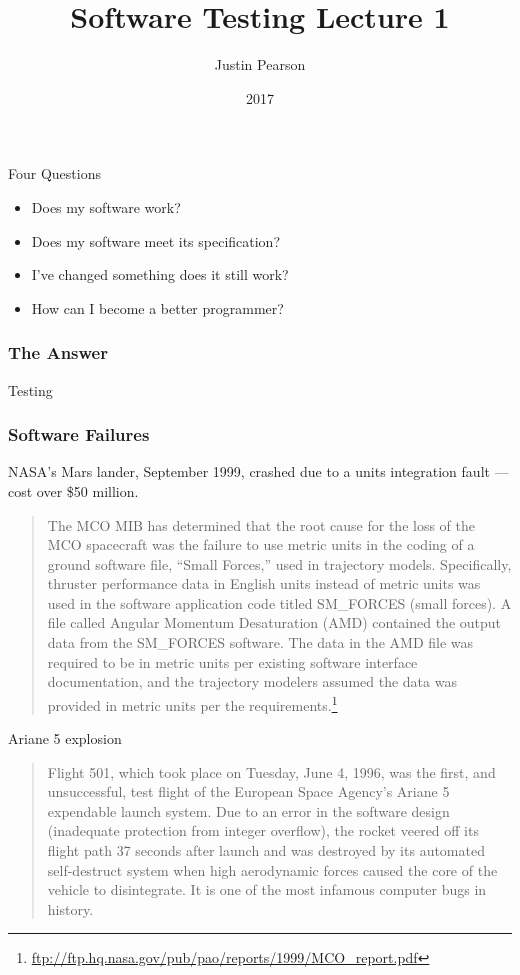 \documentclass{beamer}
\title{Software Testing  Lecture 1}
\author{Justin Pearson}
\date{2017}
\begin{document}
\lstset{language=python}

\begin{frame}
  \maketitle
\end{frame}
\begin{frame}{Four Questions}
  \begin{itemize}
  \item Does my software work? \pause
  \item Does my software meet its specification? \pause
  \item I've changed something does it still work? \pause
  \item How can I become a better programmer? 
  \end{itemize}
\end{frame}
\begin{frame}
  \frametitle{The Answer}
  \begin{center}
    {\Huge 
  Testing}
  \end{center}
\end{frame}
\begin{frame}
  \frametitle{Software Failures}

NASA's Mars lander, September 1999, crashed due to a units
    integration fault --- cost over  \$50 million.
    \begin{quote}
      The MCO MIB has determined that the root cause for the loss of
      the MCO spacecraft was the failure to use metric units in the
      coding of a ground software file, “Small Forces,” used in
      trajectory models. Specifically, thruster performance data in
      English units instead of metric units was used in the software
      application code titled SM\_FORCES (small forces). A file called
      Angular Momentum Desaturation (AMD) contained the output data
      from the SM\_FORCES software. The data in the AMD file was
      required to be in metric units per existing software interface
      documentation, and the trajectory modelers assumed the data was
      provided in metric units per the requirements.\footnote{\url{ftp://ftp.hq.nasa.gov/pub/pao/reports/1999/MCO_report.pdf}}
    \end{quote}  
\end{frame}
\begin{frame}{Ariane 5 explosion}
  \begin{quote}
    Flight 501, which took place on Tuesday, June 4, 1996, was the
    first, and unsuccessful, test flight of the European Space
    Agency's Ariane 5 expendable launch system. Due to an error in the
    software design (inadequate protection from integer overflow), the
    rocket veered off its flight path 37 seconds after launch and was
    destroyed by its automated self-destruct system when high
    aerodynamic forces caused the core of the vehicle to
    disintegrate. It is one of the most infamous computer bugs in
    history.
  \end{quote}
\end{frame}
\end{document}
